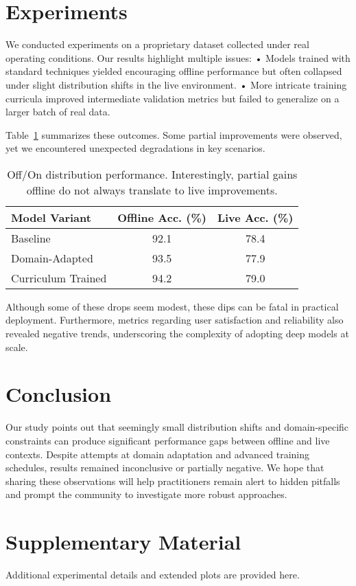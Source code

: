 \documentclass{article}
\begin{document}
\section{Experiments}
We conducted experiments on a proprietary dataset collected under real operating conditions. Our results highlight multiple issues:
• Models trained with standard techniques yielded encouraging offline performance but often collapsed under slight distribution shifts in the live environment.
• More intricate training curricula improved intermediate validation metrics but failed to generalize on a larger batch of real data.

Table~\ref{tab:main-results} summarizes these outcomes. Some partial improvements were observed, yet we encountered unexpected degradations in key scenarios.

\begin{table}[ht]
\centering
\caption{Off/On distribution performance. Interestingly, partial gains offline do not always translate to live improvements.}
\label{tab:main-results}
\begin{tabular}{@{}lcc@{}}
\toprule
\textbf{Model Variant} & \textbf{Offline Acc. (\%)} & \textbf{Live Acc. (\%)} \\
\midrule
Baseline               & 92.1                       & 78.4                      \\
Domain-Adapted        & 93.5                       & 77.9                      \\
Curriculum Trained    & 94.2                       & 79.0                      \\
\bottomrule
\end{tabular}
\end{table}

Although some of these drops seem modest, these dips can be fatal in practical deployment. Furthermore, metrics regarding user satisfaction and reliability also revealed negative trends, underscoring the complexity of adopting deep models at scale.

\section{Conclusion}
Our study points out that seemingly small distribution shifts and domain-specific constraints can produce significant performance gaps between offline and live contexts. Despite attempts at domain adaptation and advanced training schedules, results remained inconclusive or partially negative. We hope that sharing these observations will help practitioners remain alert to hidden pitfalls and prompt the community to investigate more robust approaches.




\appendix
\section{Supplementary Material}
Additional experimental details and extended plots are provided here.
\end{document}
